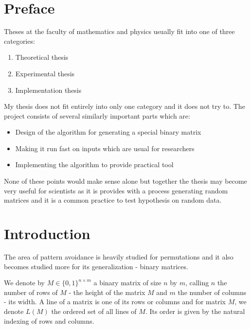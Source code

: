\chapter*{Preface}
Theses at the faculty of mathematics and physics usually fit into one of three categories:
\begin{enumerate}
\item Theoretical thesis
\item Experimental thesis
\item Implementation thesis
\end{enumerate}
My thesis does not fit entirely into only one category and it does not try to. The project consists of several similarly important parts which are:
\begin{itemize}
\item Design of the algorithm for generating a special binary matrix
\item Making it run fast on inputs which are usual for researchers
\item Implementing the algorithm to provide practical tool
\end{itemize}
None of these points would make sense alone but together the thesis may become very useful for scientists as it is provides with a process generating random matrices and it is a common practice to test hypothesis on random data.
\chapter*{Introduction}
The area of pattern avoidance is heavily studied for permutations and it also becomes studied more for its generalization - binary matrices.

We denote by $M\in\{0,1\}^{n\times m}$ a binary matrix of size $n$ by $m$, calling $n$ the number of rows of $M$ - the height of the matrix $M$ and $m$ the number of columns - its width. A line of a matrix is one of its rows or columns and for matrix $M$, we denote $L(M)$ the ordered set of all lines of $M$. Its order is given by the natural indexing of rows and columns.

